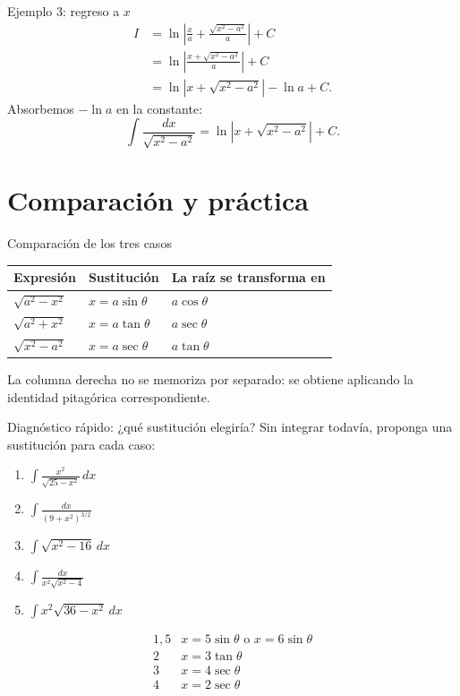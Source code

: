 \documentclass[10pt,aspectratio=169]{beamer}
\begin{document}
\begin{frame}{Ejemplo 3: regreso a $x$}
\begin{align*}
I
&=\ln\left|
\frac{x}{a}+\frac{\sqrt{x^2-a^2}}{a}
\right|+C\\
&=\ln\left|
\frac{x+\sqrt{x^2-a^2}}{a}
\right|+C\\
&=\ln|x+\sqrt{x^2-a^2}|-\ln a+C.
\end{align*}
Absorbemos $-\ln a$ en la constante:
\[
\boxed{\int\frac{dx}{\sqrt{x^2-a^2}}
=\ln|x+\sqrt{x^2-a^2}|+C.}
\]
\end{frame}

\section{Comparación y práctica}
\begin{frame}{Comparación de los tres casos}
\centering
\renewcommand{\arraystretch}{1.5}
\begin{tabular}{>{\centering\arraybackslash}m{3.2cm}>{\centering\arraybackslash}m{3.1cm}>{\centering\arraybackslash}m{4.1cm}}
\toprule
Expresión & Sustitución & La raíz se transforma en\\
\midrule
$\sqrt{a^2-x^2}$ & $x=a\sin\theta$ & $a\cos\theta$\\
$\sqrt{a^2+x^2}$ & $x=a\tan\theta$ & $a\sec\theta$\\
$\sqrt{x^2-a^2}$ & $x=a\sec\theta$ & $a\tan\theta$\\
\bottomrule
\end{tabular}
\vspace{4mm}
La columna derecha no se memoriza por separado: se obtiene aplicando la identidad pitagórica correspondiente.
\end{frame}

\begin{frame}{Diagnóstico rápido: ¿qué sustitución elegiría?}
Sin integrar todavía, proponga una sustitución para cada caso:
\begin{enumerate}
\item $\displaystyle \int \frac{x^2}{\sqrt{25-x^2}}\,dx$
\item $\displaystyle \int \frac{dx}{(9+x^2)^{3/2}}$
\item $\displaystyle \int \sqrt{x^2-16}\,dx$
\item $\displaystyle \int \frac{dx}{x^2\sqrt{x^2-4}}$
\item $\displaystyle \int x^2\sqrt{36-x^2}\,dx$
\end{enumerate}
\pause
\[
\begin{array}{c|c}
1,5 & x=5\sin\theta\text{ o }x=6\sin\theta\\
2 & x=3\tan\theta\\
3 & x=4\sec\theta\\
4 & x=2\sec\theta
\end{array}
\]
\end{frame}
\end{document}
